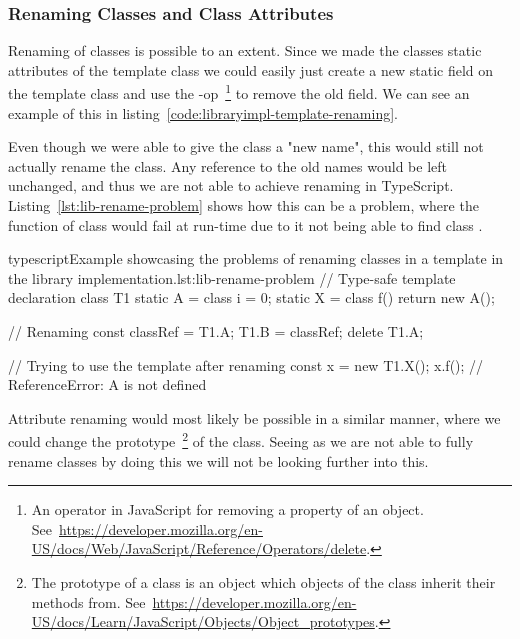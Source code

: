 \subsubsection{Renaming Classes and Class Attributes}\label{subsubsec:renaming-classes-and-class-attributes}

Renaming of classes is possible to an extent.
Since we made the classes static attributes of the template class we could easily just create a new static field on the template class and use the -op~\footnote{An operator in JavaScript for removing a property of an object. See~\url{https://developer.mozilla.org/en-US/docs/Web/JavaScript/Reference/Operators/delete}.} to remove the old field.
We can see an example of this in listing~\vref{code:libraryimpl-template-renaming}.



Even though we were able to give the class a "new name", this would still not actually rename the class.
Any reference to the old names would be left unchanged, and thus we are not able to achieve renaming in TypeScript.
Listing~\vref{lst:lib-rename-problem} shows how this can be a problem, where the function  of class  would fail at run-time due to it not being able to find class .

\begin{code}{typescript}{Example showcasing the problems of renaming classes in a template in the library implementation.}{lst:lib-rename-problem}
    // Type-safe template declaration
    class T1 {
        static A = class {
            i = 0;
        }
        static X = class {
            f() {
                return new A();
            }
        }
    }

   // Renaming
    const classRef = T1.A;
    T1.B = classRef;
    delete T1.A;

    // Trying to use the template after renaming
    const x = new T1.X();
    x.f(); // ReferenceError: A is not defined
\end{code}

Attribute renaming would most likely be possible in a similar manner, where we could change the prototype~\footnote{The prototype of a class is an object which objects of the class inherit their methods from. See~\url{https://developer.mozilla.org/en-US/docs/Learn/JavaScript/Objects/Object_prototypes}.} of the class.
Seeing as we are not able to fully rename classes by doing this we will not be looking further into this.


